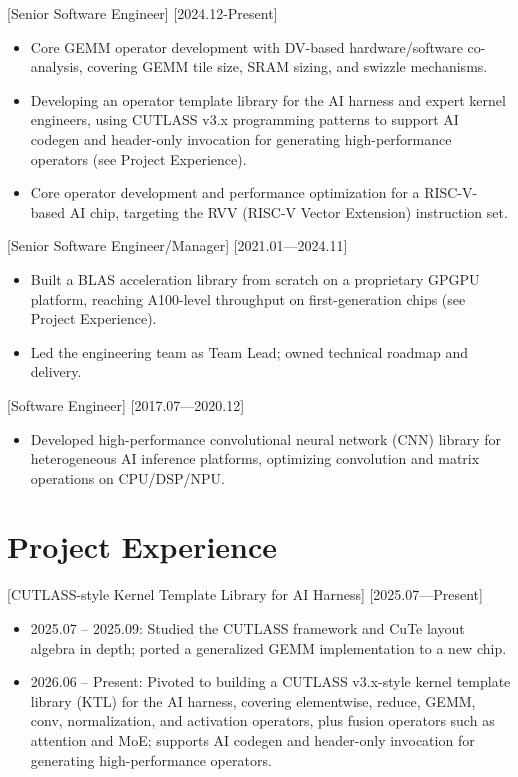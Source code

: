 \documentclass{resume}
\begin{document}
[Senior Software Engineer]
[2024.12-Present]

\begin{itemize}
  \item Core GEMM operator development with DV-based hardware/software co-analysis, covering GEMM tile size, SRAM sizing, and swizzle mechanisms.
  \item Developing an operator template library for the AI harness and expert kernel engineers, using CUTLASS v3.x programming patterns to support AI codegen and header-only invocation for generating high-performance operators (see Project Experience).
  \item Core operator development and performance optimization for a RISC-V-based AI chip, targeting the RVV (RISC-V Vector Extension) instruction set.
\end{itemize}

[Senior Software Engineer/Manager]
[2021.01—2024.11]

\begin{itemize}
  \item Built a BLAS acceleration library from scratch on a proprietary GPGPU platform, reaching A100-level throughput on first-generation chips (see Project Experience).
  \item Led the engineering team as Team Lead; owned technical roadmap and delivery.
\end{itemize}

[Software Engineer]
[2017.07—2020.12]

\begin{itemize}
  \item Developed high-performance convolutional neural network (CNN) library for heterogeneous AI inference platforms, optimizing convolution and matrix operations on CPU/DSP/NPU.
\end{itemize}

\section{Project Experience}

[CUTLASS-style Kernel Template Library for AI Harness]
[2025.07—Present]

\begin{itemize}
  \item 2025.07 -- 2025.09: Studied the CUTLASS framework and CuTe layout algebra in depth; ported a generalized GEMM implementation to a new chip.
  \item 2026.06 -- Present: Pivoted to building a CUTLASS v3.x-style kernel template library (KTL) for the AI harness, covering elementwise, reduce, GEMM, conv, normalization, and activation operators, plus fusion operators such as attention and MoE; supports AI codegen and header-only invocation for generating high-performance operators.
\end{itemize}
\end{document}
